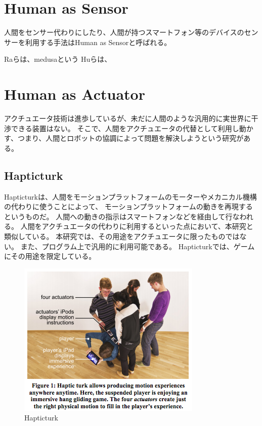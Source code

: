\section{Human as Sensor}\label{human-as-sensor}

人間をセンサー代わりにしたり、人間が持つスマートフォン等のデバイスのセンサーを利用する手法はHuman
as Sensorと呼ばれる。

\cite{prism} \cite{moboq} Raらは、medusa\cite{Ra-medusa}という
Huらは、\cite{Hu:mobilecrowdsensing}

\section{Human as Actuator}\label{human-as-actuator}

アクチュエータ技術は進歩しているが、未だに人間のような汎用的に実世界に干渉できる装置はない。
そこで、人間をアクチュエータの代替として利用し動かす、つまり、人間とロボットの協調によって問題を解決しようという研究がある。

\subsection{Hapticturk}\label{hapticturk}

Hapticturk\cite{hapticturk}は、人間をモーションプラットフォームのモーターやメカニカル機構の代わりに使うことによって、
モーションプラットフォームの動きを再現するというものだ。
人間への動きの指示はスマートフォンなどを経由して行なわれる。
人間をアクチュエータの代わりに利用するといった点において、本研究と類似している。
本研究では、その用途をアクチュエータに限ったものではない。
また、プログラム上で汎用的に利用可能である。
Hapticturkでは、ゲームにその用途を限定している。

\begin{figure}[htbp]
  \begin{center}
  \includegraphics[width=.6\linewidth,bb=0 0 332 281]{images/hapticturk.png}
  \end{center}
  \caption{Hapticturk}
  \label{fig:hapticturk}
\end{figure}

